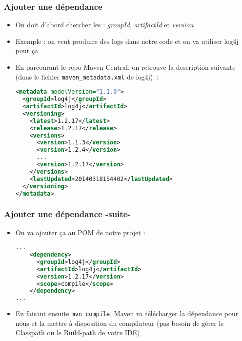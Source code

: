 \documentclass{beamer}
\begin{document}
\begin{frame}[fragile]
  \frametitle{Ajouter une dépendance}
  \begin{itemize}
  \item On doit d'abord chercher les :
    \textit{groupId}, \textit{artifactId} et \textit{version}
  \item Exemple : on veut produire des logs dans notre code et on va
    utiliser log4j pour ça
  \item En parcourant le repo Maven Central, on retrouve la
    description suivante (dans le fichier \texttt{maven\_metadata.xml} de
    log4j)~:
\begin{lstlisting}[language=XML,basicstyle=\tiny]
<metadata modelVersion="1.1.0">
  <groupId>log4j</groupId>
  <artifactId>log4j</artifactId>
  <versioning>
    <latest>1.2.17</latest>
    <release>1.2.17</release>
    <versions>
      <version>1.1.3</version>
      <version>1.2.4</version>
      ...
      <version>1.2.17</version>
    </versions>
    <lastUpdated>20140318154402</lastUpdated>
  </versioning>
</metadata>
\end{lstlisting}
\end{itemize}
\end{frame}

\begin{frame}[fragile]
  \frametitle{Ajouter une dépendance -suite-}
  \begin{itemize}
  \item On va ajouter ça au POM de notre projet :
\begin{lstlisting}[language=XML,basicstyle=\scriptsize]
...
    <dependency>
      <groupId>log4j</groupId>
      <artifactId>log4j</artifactId>
      <version>1.2.17</version>
      <scope>compile</scope>
    </dependency>  
...
\end{lstlisting}
\item En faisant ensuite \texttt{mvn compile}, Maven va télécharger la
  dépendance pour nous et la mettre à disposition du compilateur (pas besoin de gérer le Classpath ou le Build-path de votre IDE)
\end{itemize}
\end{frame}
\end{document}
